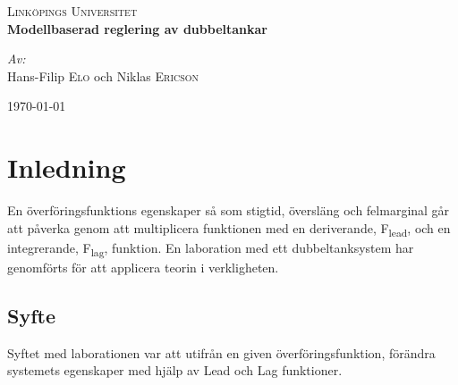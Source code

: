 \documentclass{article}
\begin{document}
\begin{titlepage}
\begin{center}


\textsc{\LARGE Link{\"o}pings Universitet}\\[1.5cm]


{ \huge \bfseries Modellbaserad reglering av dubbeltankar \\[0.4cm] }

\large
\emph{Av:}\\
Hans-Filip \textsc{Elo} och Niklas \textsc{Ericson}

\vfill

{\large \today}

\end{center}
\end{titlepage}



\renewcommand{\contentsname}{Innehållsförteckning}
\renewcommand{\listfigurename}{Figurföretckning}
\tableofcontents
\listoffigures
\newpage

\pagestyle{fancy}

\fancyhead{} %
\fancyhead[R]{\today \slshape}

\fancyfoot{} %
\fancyfoot[L,R]{\thepage}



\section{Inledning}
En överföringsfunktions egenskaper så som stigtid, översläng och felmarginal går att påverka genom att multiplicera funktionen med en deriverande, F\textsubscript{lead}, och en integrerande, F\textsubscript{lag}, funktion. En laboration med ett dubbeltanksystem har genomförts för att applicera teorin i verkligheten.

\subsection{Syfte}
Syftet med laborationen var att utifrån en given överföringsfunktion, förändra systemets egenskaper med hjälp av Lead och Lag funktioner.
\end{document}
